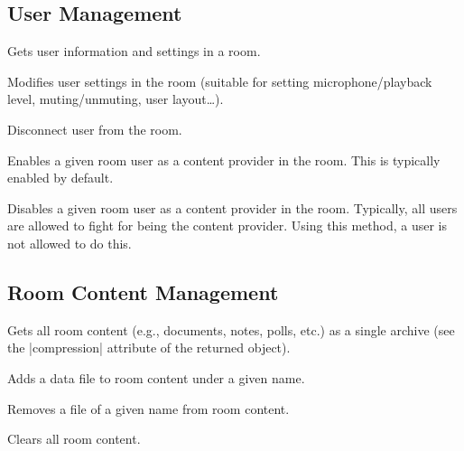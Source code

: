 \subsection{User Management}
\begin{Api}


Gets user information and settings in a room.

Modifies user settings in the room (suitable for setting
microphone/playback level, muting/unmuting, user layout\ldots).

Disconnect user from the room.

Enables a given room user as a content provider in the room. This is typically enabled by default.

Disables a given room user as a content provider in the room. Typically, all users are allowed to fight for being the content provider. Using this method, a user is not allowed to do this.

\end{Api}


\subsection{Room Content Management}
\begin{Api}

Gets all room content (e.g., documents, notes, polls, etc.) as a single archive (see the |compression| attribute of the returned object).

Adds a data file to room content under a given name.

Removes a file of a given name from room content.

Clears all room content.

\end{Api}


